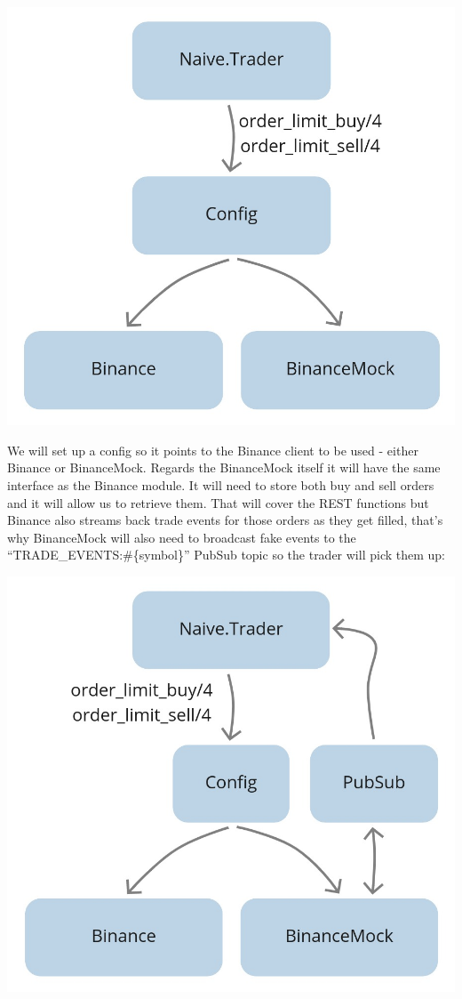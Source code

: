 \documentclass[
  oneside]{book}
\begin{document}
\begin{center}\includegraphics[width=0.8\linewidth]{images/chapter_04_02_proposal} \end{center}

We will set up a config so it points to the Binance client to be used - either Binance or BinanceMock. Regards the BinanceMock itself it will have the same interface as the Binance module.
It will need to store both buy and sell orders and it will allow us to retrieve them. That will cover the REST functions but Binance also streams back trade events for those orders as they get filled, that's why BinanceMock will also need to broadcast fake events to the ``TRADE\_EVENTS:\#\{symbol\}'' PubSub topic so the trader will pick them up:

\begin{center}\includegraphics[width=0.8\linewidth]{images/chapter_04_03_proposal_pubsub} \end{center}
\end{document}

